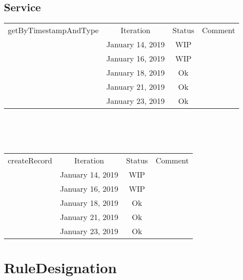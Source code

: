 \documentclass{scrreprt}
\begin{document}
\subsection{Service}
	\begin{tabularx}{12cm}{X|c|c|c}
		getByTimestampAndType & Iteration & Status & Comment  \\
		& January 14, 2019 & WIP & \\
		& January 16, 2019 & WIP & \\
		& January 18, 2019 & Ok & \\
		& January 21, 2019 & Ok & \\
		& January 23, 2019 & Ok & \\
	\end{tabularx}	
	\\ \\ \\
	\begin{tabularx}{12cm}{X|c|c|c}
		createRecord & Iteration & Status & Comment  \\
		& January 14, 2019 & WIP & \\
		& January 16, 2019 & WIP & \\
		& January 18, 2019 & Ok & \\
		& January 21, 2019 & Ok & \\
		& January 23, 2019 & Ok & \\
	\end{tabularx}	
\section{RuleDesignation}
\end{document}
